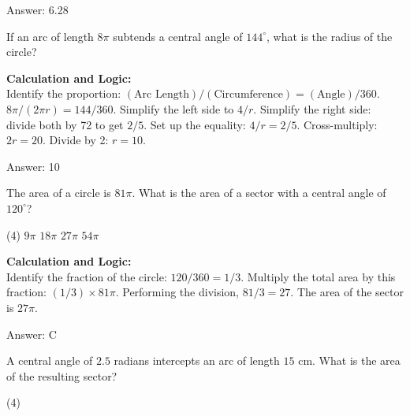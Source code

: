 \documentclass[11pt,paper=a4,answers]{exam}
\begin{document}
\begin{questions}
\begin{solution}
\vspace{30pt}

Answer: \colorbox{yellow!100}{6.28}
\end{solution}

\vspace{60pt}

\question
If an arc of length $8\pi$ subtends a central angle of $144^\circ$, what is the radius of the circle?

\begin{solution}
\textbf{Calculation and Logic:} \\
Identify the proportion: $(\text{Arc Length}) / (\text{Circumference}) = (\text{Angle}) / 360$. $8\pi / (2\pi r) = 144 / 360$. Simplify the left side to $4 / r$. Simplify the right side: divide both by 72 to get $2 / 5$. Set up the equality: $4 / r = 2 / 5$. Cross-multiply: $2r = 20$. Divide by 2: $r = 10$.

\vspace{30pt}

Answer: \colorbox{yellow!100}{10}
\end{solution}

\vspace{60pt}

\question
The area of a circle is $81\pi$. What is the area of a sector with a central angle of $120^\circ$?
\begin{tasks}(4)
    \task $9\pi$
    \task $18\pi$
    \task $27\pi$
    \task $54\pi$
\end{tasks}

\begin{solution}
\textbf{Calculation and Logic:} \\
Identify the fraction of the circle: $120 / 360 = 1 / 3$. Multiply the total area by this fraction: $(1/3) \times 81\pi$. Performing the division, $81 / 3 = 27$. The area of the sector is $27\pi$.

\vspace{30pt}

Answer: \colorbox{yellow!100}{C}
\end{solution}

\vspace{60pt}


\question
A central angle of $2.5$ radians intercepts an arc of length $15$ cm. What is the area of the resulting sector?
\begin{tasks}(4)
\end{tasks}


\end{questions}
\end{document}

